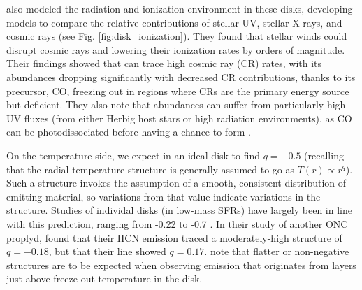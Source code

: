 \citet{Cleeves2013,Cleeves2014} also modeled the radiation and ionization environment in these disks, developing models to compare the relative contributions of stellar UV, stellar X-rays, and cosmic rays (see Fig. \ref{fig:disk_ionization}). They found that stellar winds could disrupt cosmic rays and lowering their ionization rates by orders of magnitude. Their findings showed that \hco{} can trace high cosmic ray (CR) rates, with its abundances dropping significantly with decreased CR contributions, thanks to its precursor, CO, freezing out in regions where CRs are the primary energy source but deficient. They also note that \hco{} abundances can suffer from particularly high UV fluxes (from either Herbig host stars or high radiation environments), as CO can be photodissociated before having a chance to form \hco. %


On the temperature side, we expect in an ideal disk to find $q=-0.5$ (recalling that the radial temperature structure is generally assumed to go as $T(r) \propto r^{q}$). Such a structure invokes the assumption of a smooth, consistent distribution of emitting material, so variations from that value indicate variations in the structure. Studies of individal disks (in low-mass SFRs) have largely been in line with this prediction, ranging from -0.22 \citep{Flaherty2015} to -0.7 \citep{Chapillon2008}. In their study of another ONC proplyd, \citet{Factor2017} found that their HCN emission traced a moderately-high structure of $q=-0.18$, but that their \hco{} line showed $q=0.17$. \citet{Schwarz2016} note that flatter or non-negative structures are to be expected when observing emission that originates from layers just above freeze out temperature in the disk.




